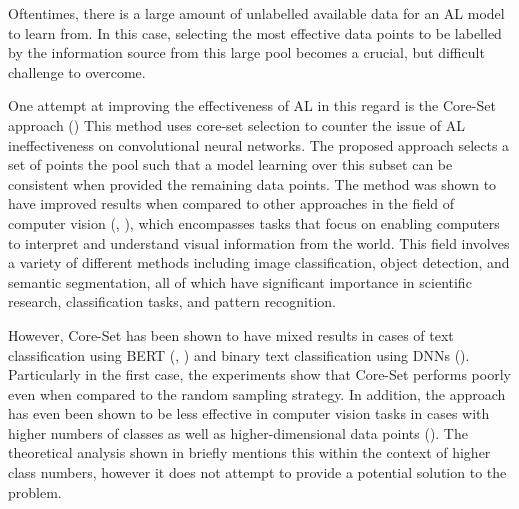\documentclass[english,bachelor,ul]{webisthesis} %
\begin{document}
Oftentimes, there is a large amount of unlabelled available data for an AL model to learn from. In this case, selecting the most effective data points to be labelled by the information source from this large pool becomes a crucial, but difficult challenge to overcome. 

One attempt at improving the effectiveness of AL in this regard is the Core-Set approach (\cite{DBLP:conf/iclr/SenerS18}) This method uses core-set selection to counter the issue of AL ineffectiveness on convolutional neural networks. The proposed approach selects a set of points the pool such that a model learning over this subset can be consistent when provided the remaining data points. The method was shown to have improved results when compared to other approaches in the field of computer vision (\cite{DBLP:conf/iclr/SenerS18}, \cite{DBLP:conf/cvpr/CaramalauBK21}), which encompasses tasks that focus on enabling computers to interpret and understand visual information from the world. This field involves a variety of different methods including image classification, object detection, and semantic segmentation, all of which have significant importance in scientific research, classification tasks, and pattern recognition.

However, Core-Set has been shown to have mixed results in cases of text classification using BERT (\cite{DBLP:conf/kdd/0002MM21}, \cite{DBLP:conf/emnlp/Ein-DorHGSDCDAK20}) and binary text classification using DNNs (\cite{DBLP:conf/cikm/Liu0LZW21}). Particularly in the first case, the experiments show that Core-Set performs poorly even when compared to the random sampling strategy. In addition, the approach has even been shown to be less effective in computer vision tasks in cases with higher numbers of classes as well as higher-dimensional data points (\cite{DBLP:conf/iccv/SinhaED19}). The theoretical analysis shown in \cite{DBLP:conf/iclr/SenerS18} briefly mentions this within the context of higher class numbers, however it does not attempt to provide a potential solution to the problem.

\end{document}
